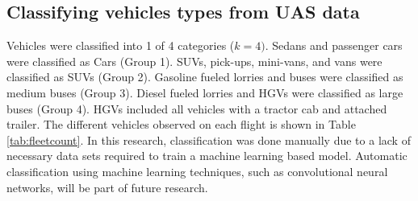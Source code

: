 \subsection{Classifying vehicles types from UAS data}
Vehicles were classified into 1 of 4 categories ($k=4)$. Sedans and passenger cars were classified as Cars (Group 1). SUVs,  pick-ups, mini-vans, and vans were classified as SUVs (Group 2). Gasoline fueled lorries and buses were classified as medium buses (Group 3). Diesel fueled lorries and HGVs were classified as large buses (Group 4). HGVs included all vehicles with a tractor cab and attached trailer. The different vehicles observed on each flight is shown in Table \ref{tab:fleetcount}. In this research, classification was done manually due to a lack of necessary data sets required to train a machine learning based model. Automatic classification using machine learning techniques, such as convolutional neural networks, will be part of future research.

\begin{table}[H]
\centering
\caption{Fleet composition from each flight.}
\label{tab:fleetcount}
\end{table}

